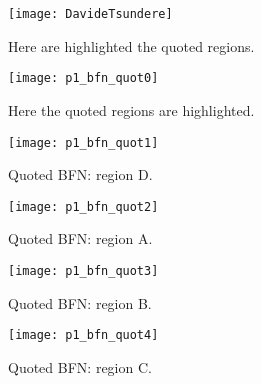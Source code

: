 \begin{figure}[t] 
	\centering
	\texttt{[image: DavideTsundere]}
	\caption{Here are highlighted the quoted regions. }
	\label{fig:p1_bfn_quot5}
\end{figure}
\newpage 
\begin{figure}[H] 
	\centering
	\texttt{[image: p1\_bfn\_quot0]}
	\caption{Here the quoted regions are highlighted. }
	\label{fig:p1_bfn_quot0}
\end{figure}

\begin{figure}[H] 
	\centering
	\texttt{[image: p1\_bfn\_quot1]}
	\caption{Quoted BFN: region D. }
	\label{fig:p1_bfn_quot1}
\end{figure}

\begin{figure}[H] 
	\centering
	\texttt{[image: p1\_bfn\_quot2]}
	\caption{Quoted BFN: region A. }
	\label{fig:p1_bfn_quot2}
\end{figure}

\begin{figure}[H] 
	\centering
	\texttt{[image: p1\_bfn\_quot3]}
	\caption{Quoted BFN: region B. }
	\label{fig:p1_bfn_quot3}
\end{figure}

\begin{figure}[H] 
	\centering
	\texttt{[image: p1\_bfn\_quot4]}
	\caption{Quoted BFN: region C. }
	\label{fig:p1_bfn_quot4}
\end{figure}

